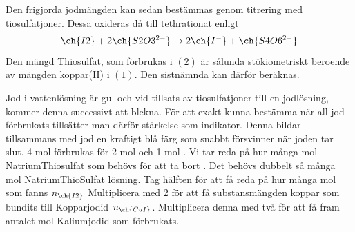 \documentclass[./chem_exercises.tex]{subfiles}
\begin{document}
Den frigjorda jodmängden kan sedan bestämmas genom
titrering med tiosulfatjoner.\leavevmode{}
Dessa oxideras då till tethrationat enligt
\begin{equation}
\ch{I2} + 2\ch{S2O3^{2-}}\rightarrow 2\ch{I^-} +\ch{S4O6^{2-}}
\end{equation}
\leavevmode{}
Den mängd Thiosulfat, som förbrukas i $(2)$ är sålunda stökiometriskt beroende av mängden koppar(II) i
$(1)$. Den sistnämnda kan därför beräknas.

Jod i vattenlösning är gul och vid tillsats av tiosulfatjoner till en jodlösning, kommer denna successivt
att blekna. För att exakt kunna bestämma när all jod förbrukats tillsätter man därför stärkelse som
indikator. Denna bildar tillsammans med jod en kraftigt blå färg som snabbt försvinner när joden tar
slut.
4 mol  förbrukas för 2 mol  och 1 mol .
Vi tar reda på hur många mol NatriumThiosulfat som behövs för att ta bort .
Det behövs dubbelt så många mol NatriumThioSulfat lösning.
Tag hälften för att få reda på hur många mol  som fanns $n_{\ch{I2}}$
Multiplicera med 2 för att få substansmängden koppar som bundits till Kopparjodid $n_{\ch{CuI}}$.
Multiplicera denna med två för att få fram antalet mol Kaliumjodid som förbrukats.
\end{document}
